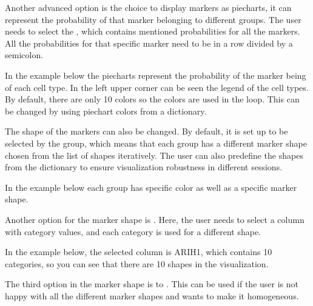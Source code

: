 \documentclass[letterpaper,10pt,english,openany,oneside]{sphinxmanual}
\begin{document}
\sphinxAtStartPar
{}

\sphinxAtStartPar
Another advanced option is the choice to display markers as pie\sphinxhyphen{}charts, it can represent the probability of that marker belonging to different groups. The user needs to select the , which contains mentioned probabilities for all the markers. All the probabilities for that specific marker need to be in a row divided by a semicolon.

\sphinxAtStartPar
{}

\sphinxAtStartPar
In the example below the pie\sphinxhyphen{}charts represent the probability of the marker being of each cell type. In the left upper corner can be seen the legend of the cell types. By default, there are only 10 colors so the colors are used in the loop. This can be changed by using pie\sphinxhyphen{}chart colors from a dictionary.

\sphinxAtStartPar
{}

\sphinxAtStartPar
The shape of the markers can also be changed. By default, it is set up to be selected by the group, which means that each group has a different marker shape chosen from the list of shapes iteratively. The user can also pre\sphinxhyphen{}define the shapes from the dictionary to ensure visualization robustness in different sessions.

\sphinxAtStartPar
{}

\sphinxAtStartPar
In the example below each group has specific color as well as a specific marker shape.

\sphinxAtStartPar
{}

\sphinxAtStartPar
Another option for the marker shape is . Here, the user needs to select a column with category values, and each category is used for a different shape.

\sphinxAtStartPar
{}

\sphinxAtStartPar
In the example below, the selected column is ARIH1, which contains 10 categories, so you can see that there are 10 shapes in the visualization.

\sphinxAtStartPar
{}

\sphinxAtStartPar
The third option in the marker shape is to . This can be used if the user is not happy with all the different marker shapes and wants to make it homogeneous.
\end{document}
